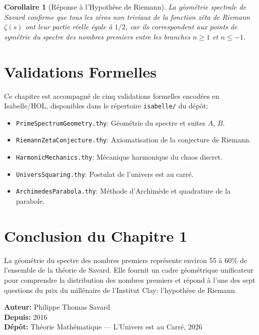 \documentclass[12pt,a4paper]{article}
\newtheorem{corollaire}{Corollaire}
\begin{document}
\begin{corollaire}[Réponse à l'Hypothèse de Riemann]
La géométrie spectrale de Savard confirme que tous les zéros non triviaux de la
fonction zêta de Riemann $\zeta(s)$ ont leur partie réelle égale à $1/2$, car ils
correspondent aux points de symétrie du spectre des nombres premiers entre les
branches $n \geq 1$ et $n \leq -1$.
\end{corollaire}

\section{Validations Formelles}

Ce chapitre est accompagné de cinq validations formelles encodées en Isabelle/HOL,
disponibles dans le répertoire \texttt{isabelle/} du dépôt:

\begin{itemize}
  \item \texttt{PrimeSpectrumGeometry.thy}: Géométrie du spectre et suites $A$, $B$.
  \item \texttt{RiemannZetaConjecture.thy}: Axiomatisation de la conjecture de Riemann.
  \item \texttt{HarmonicMechanics.thy}: Mécanique harmonique du chaos discret.
  \item \texttt{UniversSquaring.thy}: Postulat de l'univers est au carré.
  \item \texttt{ArchimedesParabola.thy}: Méthode d'Archimède et quadrature de la parabole.
\end{itemize}

\section{Conclusion du Chapitre 1}

La géométrie du spectre des nombres premiers représente environ 55 à 60\% de l'ensemble
de la théorie de Savard. Elle fournit un cadre géométrique unificateur pour comprendre
la distribution des nombres premiers et répond à l'une des sept questions du prix du
millénaire de l'Institut Clay: l'hypothèse de Riemann.

\bigskip
\noindent\textbf{Auteur:} Philippe Thomas Savard\\
\noindent\textbf{Depuis:} 2016\\
\noindent\textbf{Dépôt:} Théorie Mathématique — L'Univers est au Carré, 2026
\end{document}
